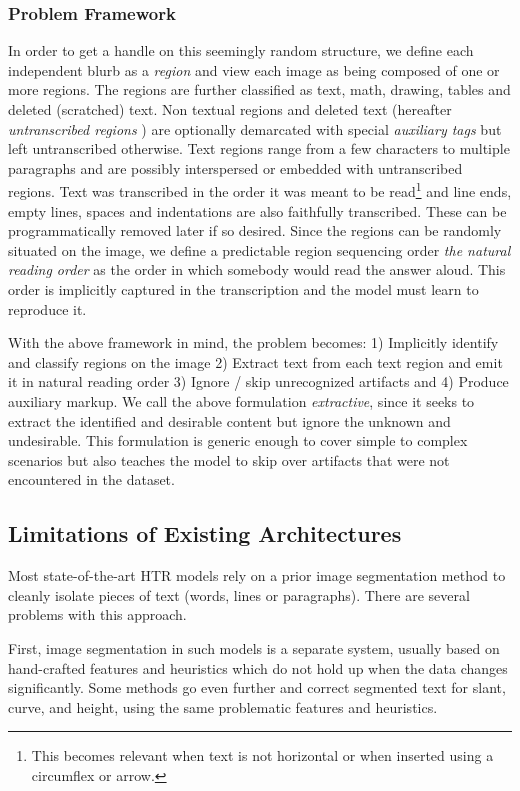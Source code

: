 \documentclass[runningheads]{llncs}
\begin{document}
\subsubsection{Problem Framework}
\label{sec-problem-framework}
In order to get a handle on this seemingly random structure, we define each independent blurb as a \textit{region} and view each image as being composed of one or more regions. The regions are further classified as text, math, drawing, tables and deleted (scratched) text. Non textual regions and deleted text (hereafter \textit{untranscribed regions} ) are optionally demarcated with special \textit{auxiliary tags} but left untranscribed otherwise. Text regions range from a few characters to multiple paragraphs and are possibly interspersed or embedded with untranscribed regions. Text was transcribed in the order it was meant to be read\footnote{This becomes relevant when text is not horizontal or when inserted using a circumflex or arrow.} and line ends, empty lines, spaces and indentations are also faithfully transcribed. These can be programmatically removed later if so desired. Since the regions can be randomly  situated on the image, we define a predictable region sequencing order \textit{the natural reading order} as the order in which somebody would read the answer aloud. This order is implicitly captured in the transcription and the model must learn to reproduce it.

With the above framework in mind, the problem becomes: 1) Implicitly identify and classify regions on the image 2) Extract text from each text region and emit it in natural reading order 3) Ignore / skip unrecognized artifacts and 4) Produce auxiliary markup. We call the above formulation \emph{extractive}, since it seeks to extract the identified and desirable content but ignore the unknown and undesirable. This formulation is generic enough to cover simple to complex scenarios but also teaches the model to skip over artifacts that were not encountered in the dataset.

\subsection{Limitations of Existing Architectures}
\label{sec-limitations-of-SOTA}
Most state-of-the-art HTR models rely on a prior image segmentation method to cleanly isolate pieces of text (words, lines or paragraphs).
There are several problems with this approach.

First, image segmentation in such models is a separate system, usually based on hand-crafted features and heuristics which do not hold up when the data changes significantly.
Some methods go even further and correct segmented text for slant, curve, and height, using the same problematic features and heuristics.
\end{document}
